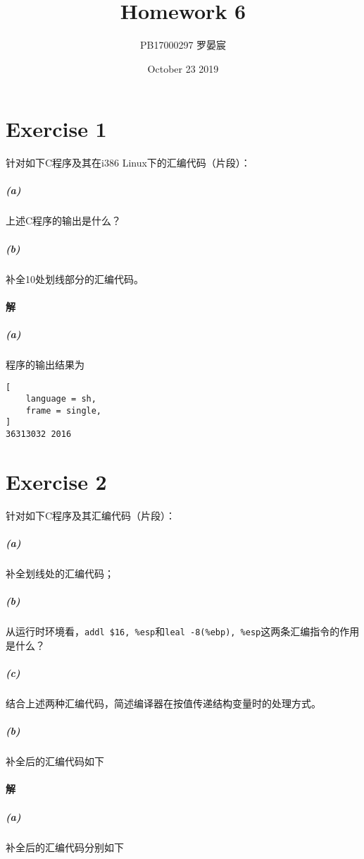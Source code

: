 \documentclass{article}
\title{Homework 6}
\author{PB17000297 罗晏宸}
\date{October 23 2019}
\newcommand{\CodeBlock}[2]{
    \begin{figure}[H]
        \begin{mdframed}[
            style = Default,
        ]
            
        \end{mdframed}
    \end{figure}
}
\begin{document}
\maketitle

\section*{Exercise 1}
针对如下C程序及其在i386 Linux下的汇编代码（片段）：

\CodeBlock{C}{./Ex1.c}
\subparagraph*{(a)}
上述C程序的输出是什么？
\subparagraph*{(b)}
补全10处划线部分的汇编代码。
\CodeBlock{Assembler}{./Ex1_Unfilled.s}

\paragraph{解}
\subparagraph*{(a)}
程序的输出结果为
\begin{lstlisting}[
    language = sh,
    frame = single,
]
36313032 2016
\end{lstlisting}

\section*{Exercise 2}
针对如下C程序及其汇编代码（片段）：
\subparagraph*{(a)}
补全划线处的汇编代码；
\subparagraph*{(b)}
从运行时环境看，\lstinline[style = Assembler]{addl $16, %esp}和\lstinline[style = Assembler]{leal -8(%ebp), %esp}这两条汇编指令的作用是什么？
\subparagraph*{(c)}
结合上述两种汇编代码，简述编译器在按值传递结构变量时的处理方式。

\subparagraph*{(b)}
补全后的汇编代码如下

\CodeBlock{Assembler}{./Ex1_Filled.s}

\CodeBlock{C}{./Ex2.c}

\CodeBlock{Assembler}{./Ex2_N=2.s}

\CodeBlock{Assembler}{./Ex2_N=11.s}

\paragraph{解}
\subparagraph*{(a)}
补全后的汇编代码分别如下

\CodeBlock{Assembler}{./Ex2_N=2_Filled.s}
\end{document}

